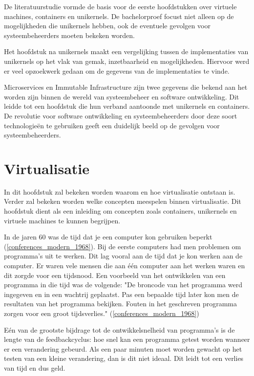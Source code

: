 \documentclass[pdftex,a4paper,12pt,twoside]{report}
\begin{document}
De literatuurstudie vormde de basis voor de eerste hoofdstukken over virtuele machines, containers en unikernels. De bachelorproef focust niet alleen op de mogelijkheden die unikernels hebben, ook de eventuele gevolgen voor systeembeheerders moeten bekeken worden.

Het hoofdstuk na unikernels maakt een vergelijking tussen de implementaties van unikernels op het vlak van gemak, inzetbaarheid en mogelijkheden. Hiervoor werd er veel opzoekwerk gedaan om de gegevens van de implementaties te vinde.

Microservices en Immutable Infrastructure zijn twee gegevens die bekend aan het worden zijn binnen de wereld van systeembeheer en software ontwikkeling. Dit leidde tot een hoofdstuk die hun verband aantoonde met unikernels en containers. De revolutie voor software ontwikkeling en systeembeheerders door deze soort technologieën te gebruiken geeft een duidelijk beeld op de gevolgen voor systeembeheerders.

\chapter{Virtualisatie}
\label{ch:virtualisatie}

In dit hoofdstuk zal bekeken worden waarom en hoe virtualisatie ontstaan is. Verder zal bekeken worden welke concepten meespelen binnen virtualisatie. Dit hoofdstuk dient als een inleiding om concepten zoals containers, unikernels en virtuele machines te kunnen begrijpen.

In de jaren 60 was de tijd dat je een computer kon gebruiken beperkt (\ref{conferences_modern_1968}).  Bij de eerste computers had men problemen om programma's uit te werken. Dit lag vooral aan de tijd dat je kon werken aan de computer. Er waren vele mensen die aan één computer aan het werken waren en dit zorgde voor een tijdsnood. Een voorbeeld van het ontwikkelen van een programma in die tijd was de volgende: "De broncode van het programma werd ingegeven en in een wachtrij geplaatst. Pas een bepaalde tijd later kon men de resultaten van het programma bekijken. Fouten in het geschreven programma zorgen voor een groot tijdsverlies." (\ref{conferences_modern_1968})

Eén van de grootste bijdrage tot de ontwikkelsnelheid van programma's is de lengte van de feedbackcyclus: hoe snel kan een programma getest worden wanneer er een verandering gebeurd. Als een paar minuten moet worden gewacht op het testen van een kleine verandering, dan is dit niet ideaal. Dit leidt tot een verlies van tijd en dus geld.
\end{document}
